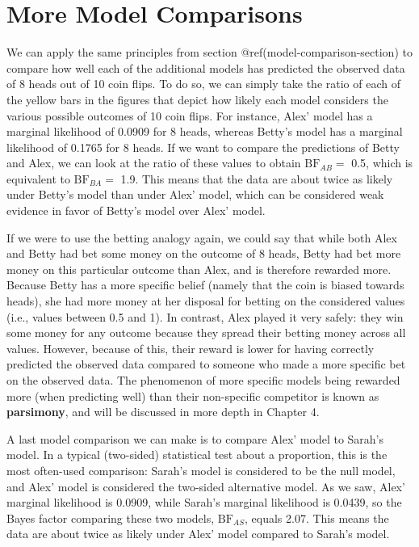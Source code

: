 \documentclass[
  letterpaper,
  DIV=11,
  numbers=noendperiod]{scrreprt}
\begin{document}
\hypertarget{more-model-comparison-section}{%
\section{More Model Comparisons}\label{more-model-comparison-section}}

We can apply the same principles from section
@ref(model-comparison-section) to compare how well each of the
additional models has predicted the observed data of 8 heads out of 10
coin flips. To do so, we can simply take the ratio of each of the yellow
bars in the figures that depict how likely each model considers the
various possible outcomes of 10 coin flips. For instance, Alex' model
has a marginal likelihood of 0.0909 for 8 heads, whereas Betty's model
has a marginal likelihood of 0.1765 for 8 heads. If we want to compare
the predictions of Betty and Alex, we can look at the ratio of these
values to obtain \(\text{BF}_{AB} =\) 0.5, which is equivalent to
\(\text{BF}_{BA} =\) 1.9. This means that the data are about twice as
likely under Betty's model than under Alex' model, which can be
considered weak evidence in favor of Betty's model over Alex' model.

If we were to use the betting analogy again, we could say that while
both Alex and Betty had bet some money on the outcome of 8 heads, Betty
had bet more money on this particular outcome than Alex, and is
therefore rewarded more. Because Betty has a more specific belief
(namely that the coin is biased towards heads), she had more money at
her disposal for betting on the considered values (i.e., values between
0.5 and 1). In contrast, Alex played it very safely: they win some money
for any outcome because they spread their betting money across all
values. However, because of this, their reward is lower for having
correctly predicted the observed data compared to someone who made a
more specific bet on the observed data. The phenomenon of more specific
models being rewarded more (when predicting well) than their
non-specific competitor is known as \textbf{parsimony}, and will be
discussed in more depth in Chapter 4.

A last model comparison we can make is to compare Alex' model to Sarah's
model. In a typical (two-sided) statistical test about a proportion,
this is the most often-used comparison: Sarah's model is considered to
be the null model, and Alex' model is considered the two-sided
alternative model. As we saw, Alex' marginal likelihood is 0.0909, while
Sarah's marginal likelihood is 0.0439, so the Bayes factor comparing
these two models, \(\text{BF}_{AS}\), equals 2.07. This means the data
are about twice as likely under Alex' model compared to Sarah's model.
\end{document}

